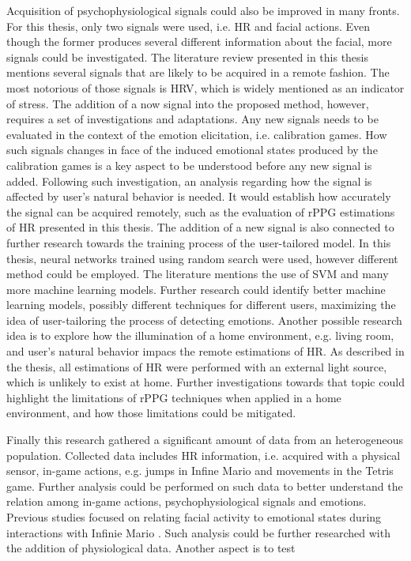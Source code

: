 Acquisition of psychophysiological signals could also be improved in many fronts. For this thesis, only two signals were used, i.e. HR and facial actions. Even though the former produces several different information about the facial, more signals could be investigated. The literature review presented in this thesis mentions several signals that are likely to be acquired in a remote fashion. The most notorious of those signals is HRV, which is widely mentioned as an indicator of stress. The addition of a now signal into the proposed method, however, requires a set of investigations and adaptations. Any new signals needs to be evaluated in the context of the emotion elicitation, i.e. calibration games. How such signals changes in face of the induced emotional states produced by the calibration games is a key aspect to be understood before any new signal is added. Following such investigation, an analysis regarding how the signal is affected by user's natural behavior is needed. It would establish how accurately the signal can be acquired remotely, such as the evaluation of rPPG estimations of HR presented in this thesis. The addition of a new signal is also connected to further research towards the training process of the user-tailored model. In this thesis, neural networks trained using random search were used, however different method could be employed. The literature mentions the use of SVM and many more machine learning models. Further research could identify better machine learning models, possibly different techniques for different users, maximizing the idea of user-tailoring the process of detecting emotions. Another possible research idea is to explore how the illumination of a home environment, e.g. living room, and user's natural behavior impacs the remote estimations of HR. As described in the thesis, all estimations of HR were performed with an external light source, which is unlikely to exist at home. Further investigations towards that topic could highlight the limitations of rPPG techniques when applied in a home environment, and how those limitations could be mitigated.

Finally this research gathered a significant amount of data from an heterogeneous population. Collected data includes HR information, i.e. acquired with a physical sensor, in-game actions, e.g. jumps in Infine Mario and movements in the Tetris game. Further analysis could be performed on such data to better understand the relation among in-game actions, psychophysiological signals and emotions. Previous studies focused on relating facial activity to emotional states during interactions with Infinie Mario \parencite{shaker2011feature}. Such analysis could be further researched with the addition of physiological data. Another aspect is to test



